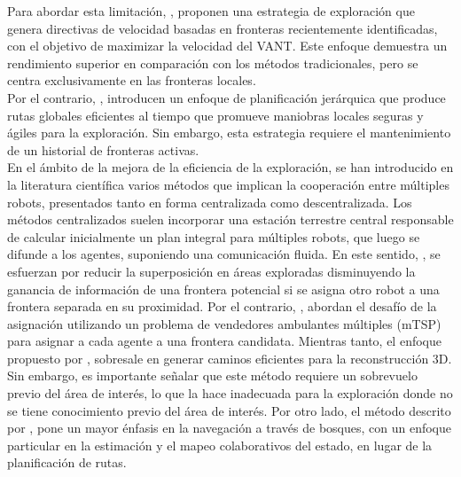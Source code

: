 \documentclass[sigconf]{acmart}
\begin{document}
Para abordar esta limitación, \citeauthor{CIESLEWSKI2017} \cite{CIESLEWSKI2017}, proponen una estrategia de exploración que genera directivas de velocidad basadas en fronteras recientemente identificadas, con el objetivo de maximizar la velocidad del VANT. Este enfoque demuestra un rendimiento superior en comparación con los métodos tradicionales, pero se centra exclusivamente en las fronteras locales.\\

Por el contrario, \citeauthor{FUEL} \cite{FUEL}, introducen un enfoque de planificación jerárquica que produce rutas globales eficientes al tiempo que promueve maniobras locales seguras y ágiles para la exploración. Sin embargo, esta estrategia requiere el mantenimiento de un historial de fronteras activas.\\ %

En el ámbito de la mejora de la eficiencia de la exploración, se han introducido en la literatura científica varios métodos que implican la cooperación entre múltiples robots, presentados tanto en forma centralizada como descentralizada. Los métodos centralizados suelen incorporar una estación terrestre central responsable de calcular inicialmente un plan integral para múltiples robots, que luego se difunde a los agentes, suponiendo una comunicación fluida. En este sentido, \citeauthor{1435481} \cite{1435481}, se esfuerzan por reducir la superposición en áreas exploradas disminuyendo la ganancia de información de una frontera potencial si se asigna otro robot a una frontera separada en su proximidad. Por el contrario, \citeauthor{Tian} \cite{Tian}, abordan el desafío de la asignación utilizando un problema de vendedores ambulantes múltiples (mTSP) para asignar a cada agente a una frontera candidata. Mientras tanto, el enfoque propuesto por \citeauthor{9844235} \cite{9844235}, sobresale en generar caminos eficientes para la reconstrucción 3D. Sin embargo, es importante señalar que este método requiere un sobrevuelo previo del área de interés, lo que la hace inadecuada para la exploración donde no se tiene conocimiento previo del área de interés. Por otro lado, el método descrito por \citeauthor{Tian} \cite{Tian}, pone un mayor énfasis en la navegación a través de bosques, con un enfoque particular en la estimación y el mapeo colaborativos del estado, en lugar de la planificación de rutas.\\
\end{document}
